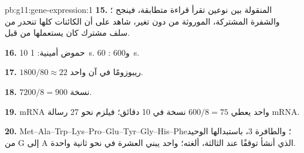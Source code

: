 \begin{solution}{pb:g11:gene-expression:1}
\textbf{15.}  المنقولة بين نوعين تقرأ قراءة متطابقة، فينجح
؛ والشفرة المشتركة، الموروثة من دون تغير، شاهد على أن
الكائنات كلها تنحدر من سلف مشترك كان يستعملها من قبل.

\textbf{16.} 10 حموض أمينية: \qty{1}{s}. و600 : \qty{60}{s}.

\textbf{17.} $1800/80 \approx 22$ ريبوزومًا في آن واحد.

\textbf{18.} $7200/8 = 900$ نسخة.

\textbf{19.} mRNA واحد يعطي $600/8 = 75$ نسخة في 10 دقائق؛ فيلزم نحو
27 رسالة mRNA.

\textbf{20.} 
Met--Ala--Trp--Lys--Pro--Glu--Tyr--Gly--His--Phe؛ والطافرة 3،
باستبدالها الوحيد من G إلى A الذي أنشأ توقفًا عند  الثالثة،
ألغته؛  واحد يبني  العشرة في نحو ثانية واحدة.
\end{solution}

